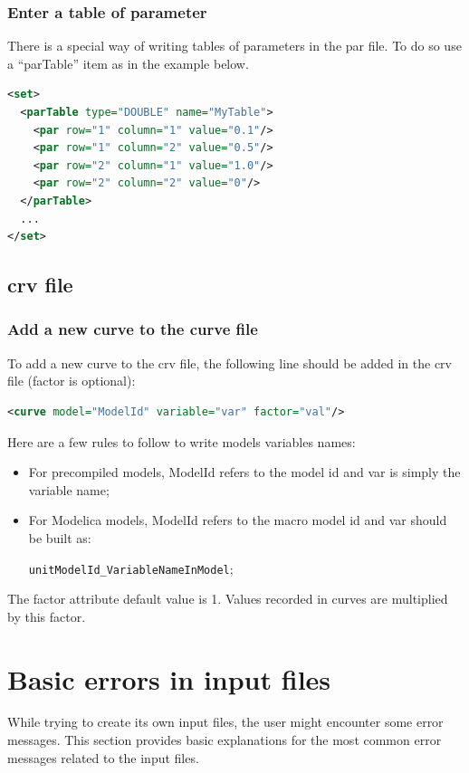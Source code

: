 \documentclass[a4paper, 12pt]{report}
\begin{document}
\subsubsection{Enter a table of parameter}

There is a special way of writing tables of parameters in the par file. To do so use a ``parTable'' item as in the example below.
\begin{lstlisting}[language=XML, morekeywords={parTable}]
<set>
  <parTable type="DOUBLE" name="MyTable">
    <par row="1" column="1" value="0.1"/>
    <par row="1" column="2" value="0.5"/>
    <par row="2" column="1" value="1.0"/>
    <par row="2" column="2" value="0"/>
  </parTable>
  ...
</set>
\end{lstlisting}

\subsection{crv file}

\subsubsection{Add a new curve to the curve file}

To add a new curve to the crv file, the following line should be added in the crv file (factor is optional):
\begin{lstlisting}[language=XML,numbers=none]
<curve model="ModelId" variable="var" factor="val"/>
\end{lstlisting}

Here are a few rules to follow to write models variables names:
\begin{itemize}
\item For precompiled models, ModelId refers to the model id and var is simply the variable name;
\item For Modelica models, ModelId refers to the macro model id and var should be built as:

\verb|unitModelId_VariableNameInModel|;
\end{itemize}

The factor attribute default value is 1. Values recorded in curves are multiplied by this factor.

\section{Basic errors in input files}

While trying to create its own input files, the user might encounter some error messages. This section provides basic explanations for the most common error messages related to the input files. \\
\end{document}
